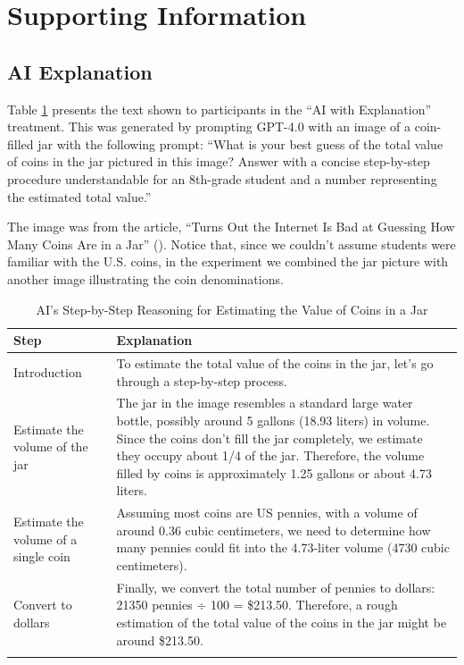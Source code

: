 \documentclass[
  12pt, %
]{article}
\begin{document}
\clearpage
\processdelayedfloats
\clearpage
\appendix
\setcounter{table}{0}
\setcounter{figure}{0}
\renewcommand{\thetable}{A\arabic{table}}
\renewcommand{\thefigure}{A\arabic{figure}}

\section{Supporting Information}\label{supporting-information}

\subsection{AI Explanation}\label{sec:si-ai-explanation}

Table \ref{tab:explanation} presents the text shown to participants in the ``AI with Explanation'' treatment. This was generated by prompting GPT-4.0 with an image of a coin-filled jar with the following prompt: ``What is your best guess of the total value of coins in the jar pictured in this image? Answer with a concise step-by-step procedure understandable for an 8th-grade student and a number representing the estimated total value.''

The image was from the article, ``Turns Out the Internet Is Bad at Guessing How Many Coins Are in a Jar'' (). Notice that, since we couldn't assume students were familiar with the U.S. coins, in the experiment we combined the jar picture with another image illustrating the coin denominations.
\begin{table}

\caption{\label{tab:explanation}AI's Step-by-Step Reasoning for Estimating the Value of Coins in a Jar}
\centering
\begin{tabular}[t]{l>{\raggedright\arraybackslash}p{4in}}
\toprule
Step & Explanation\\
\midrule\arrayrulecolor{gray!20}
Introduction & To estimate the total value of the coins in the jar, let's go through a step-by-step process.\\
Estimate the volume of the jar & The jar in the image resembles a standard large water bottle, possibly around 5 gallons (18.93 liters) in volume. Since the coins don't fill the jar completely, we estimate they occupy about 1/4 of the jar. Therefore, the volume filled by coins is approximately 1.25 gallons or about 4.73 liters.\\
Estimate the volume of a single coin & Assuming most coins are US pennies, with a volume of around 0.36 cubic centimeters, we need to determine how many pennies could fit into the 4.73-liter volume (4730 cubic centimeters).\\
Convert to dollars & Finally, we convert the total number of pennies to dollars: 21350 pennies ÷ 100 = \$213.50. Therefore, a rough estimation of the total value of the coins in the jar might be around \$213.50.\\
\arrayrulecolor{black}\bottomrule
\end{tabular}

\end{table}
\newpage
\end{document}
